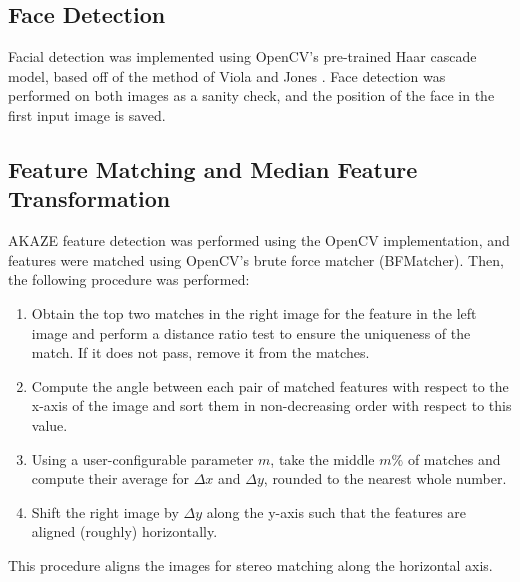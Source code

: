 \documentclass[10pt,twocolumn,letterpaper]{article}
\begin{document}
\subsection{Face Detection}

Facial detection was implemented using OpenCV's pre-trained Haar cascade model, based off of the method of Viola and Jones \cite{viola_jones_2004}.
Face detection was performed on both images as a sanity check, and the position of the face in the first input image is saved.

\subsection{Feature Matching and Median Feature Transformation}

AKAZE \cite{alcantarilla_nuevo_bartoli_2013} feature detection was performed using the OpenCV implementation, and features were matched using
OpenCV's brute force matcher (BFMatcher). Then, the following procedure was performed:
\begin{enumerate}
    \item Obtain the top two matches in the right image for the feature in the left image and perform a distance ratio test to ensure the uniqueness of the match. If it does not pass, remove it from the matches.
    \item Compute the angle between each pair of matched features with respect to the x-axis of the image and sort them in non-decreasing order with respect to this value.
    \item Using a user-configurable parameter $m$, take the middle $m\%$ of matches and compute their average for $\Delta x$ and $\Delta y$, rounded to the nearest whole number.
    \item Shift the right image by $\Delta y$ along the y-axis such that the features are aligned (roughly) horizontally.
\end{enumerate}

This procedure aligns the images for stereo matching along the horizontal axis.
\end{document}
